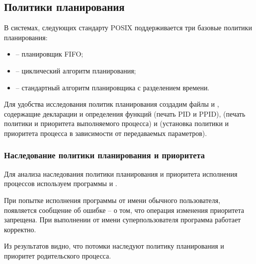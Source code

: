 
 
\subsection{Политики планирования}

В системах, следующих стандарту POSIX поддерживается три базовые политики планирования:
\begin{itemize}
	\item {} -- планировщик FIFO;
	\item {} -- циклический алгоритм планирования;
	\item {} -- стандартный алгоритм планировщика с	разделением времени.
\end{itemize}

Для удобства исследования политик планирования создадим файлы  и , содержащие декларации и определения функций  (печать PID и PPID),  (печать политики и приоритета выполняемого процесса) и  (установка политики и приоритета процесса в зависимости от передаваемых параметров).





\subsubsection{Наследование политики планирования и приоритета}

Для анализа наследования политики планирования и приоритета исполнения процессов используем программы  и .





При попытке исполнения программы от имени обычного пользователя, появляется сообщение об ошибке – о том, что операция изменения приоритета запрещена. При выполнении от имени суперпользователя программа работает корректно.



Из результатов видно, что потомки наследуют политику планирования и приоритет родительского процесса.


